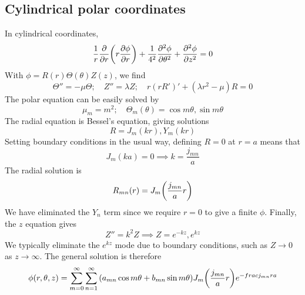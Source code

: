 \subsection{Cylindrical polar coordinates}
In cylindrical coordinates,
\[
	\frac{1}{r} \pdv{r} \qty(r \pdv{\phi}{r}) + \frac{1}{4^2} \pdv[2]{\phi}{\theta} + \pdv[2]{\phi}{z} = 0
\]
With \( \phi = R(r) \Theta(\theta) Z(z) \), we find
\[
	\Theta'' = -\mu \Theta;\quad Z'' = \lambda Z;\quad r(rR')' + (\lambda r^2 - \mu) R = 0
\]
The polar equation can be easily solved by
\[
	\mu_m = m^2;\quad \Theta_m(\theta) = \cos m\theta, \sin m\theta
\]
The radial equation is Bessel's equation, giving solutions
\[
	R = J_m(kr), Y_m(kr)
\]
Setting boundary conditions in the usual way, defining \( R=0 \) at \( r = a \) means that
\[
	J_m(ka) = 0 \implies k = \frac{j_{mn}}{a}
\]
The radial solution is
\[
	R_{mn}(r) = J_m\qty(\frac{j_{mn}}{a}r)
\]
We have eliminated the \( Y_n \) term since we require \( r = 0 \) to give a finite \( \phi \).
Finally, the \( z \) equation gives
\[
	Z'' = k^2 Z \implies Z = e^{-kz}, e^{kz}
\]
We typically eliminate the \( e^{kz} \) mode due to boundary conditions, such as \( Z \to 0 \) as \( z \to \infty \).
The general solution is therefore
\[
	\phi(r,\theta,z) = \sum_{m=0}^\infty \sum_{n = 1}^\infty \qty(a_{mn} \cos m\theta + b_{mn} \sin m\theta) J_m\qty(\frac{j_{mn}}{a} r) e^{-frac{j_{mn}r}{a}}
\]


